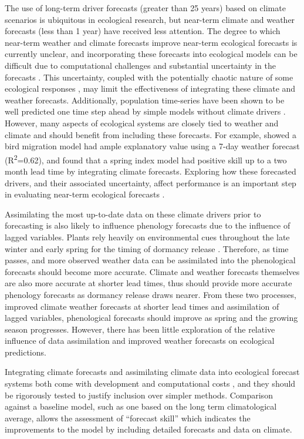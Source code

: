 \documentclass[fleqn,10pt,lineno]{wlpeerj}
\begin{document}
The use of long-term driver forecasts (greater than 25 years) based on climate scenarios is ubiquitous in ecological research, but near-term climate and weather forecasts (less than 1 year) have received less attention. The degree to which near-term weather and climate forecasts improve near-term ecological forecasts is currently unclear, and incorporating these forecasts into ecological models can be difficult due to computational challenges \citep{taylor2020a} and substantial uncertainty in the forecasts \citep{dietze2017}. This uncertainty, coupled with the potentially chaotic nature of some ecological responses \citep{perretti2013}, may limit the effectiveness of integrating these climate and weather forecasts. Additionally, population time-series have been shown to be well predicted one time step ahead by simple models without climate drivers \citep{ward2014}. However, many aspects of ecological systems are closely tied to weather and climate and should benefit from including these forecasts. For example, \cite{vandoren2018} showed a bird migration model had ample explanatory value using a 7-day weather forecast (R\textsuperscript{2}=0.62), and \cite{carrillo2018} found that a spring index model had positive skill up to a two month lead time by integrating climate forecasts. Exploring how these forecasted drivers, and their associated uncertainty, affect performance is an important step in evaluating near-term ecological forecasts \citep{dietze2018}. 

Assimilating the most up-to-date data on these climate drivers prior to forecasting is also likely to influence phenology forecasts due to the influence of lagged variables. Plants rely heavily on environmental cues throughout the late winter and early spring for the timing of dormancy release \citep{chuine2017, piao2019}. Therefore, as time passes, and more observed weather data can be assimilated into the phenological forecasts should become more accurate. Climate and weather forecasts themselves are also more accurate at shorter lead times, thus should provide more accurate phenology forecasts as dormancy release draws nearer. From these two processes, improved climate weather forecasts at shorter lead times and assimilation of lagged variables, phenological forecasts should improve as spring and the growing season progresses. However, there has been little exploration of the relative influence of data assimilation and improved weather forecasts on ecological predictions. 

Integrating climate forecasts and assimilating climate data into ecological forecast systems both come with development and computational costs \citep{taylor2020a, thomas2020, welch2019}, and they should be rigorously tested to justify inclusion over simpler methods. Comparison against a baseline model, such as one based on the long term climatological average, allows the assessment of “forecast skill”  \citep{jolliffe2003, harris2018} which indicates the improvements to the model by including detailed forecasts and data on climate. 
\end{document}
